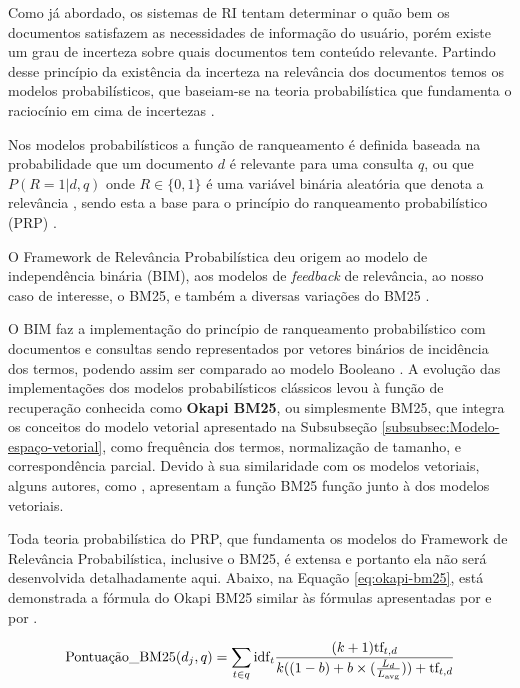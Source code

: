     Como já abordado, os sistemas de RI tentam determinar o quão bem os documentos satisfazem as necessidades de informação do usuário, porém existe um grau de incerteza sobre quais documentos tem conteúdo relevante. 
    Partindo desse princípio da existência da incerteza na relevância dos documentos temos os modelos probabilísticos, que baseiam-se na teoria probabilística que fundamenta o raciocínio em cima de incertezas \cite[p.~201]{Manning2008IIR}. 
    
    Nos modelos probabilísticos a função de ranqueamento é definida baseada na probabilidade que um documento $d$ é relevante para uma consulta $q$, ou que $P(R = 1| d,q)$ onde $R \in \{0, 1\}$ é uma variável binária aleatória que denota a relevância \cite[p.~111--112]{Zhai2016TDMA}, sendo esta a base para o princípio do ranqueamento probabilístico (PRP) \cite[p.~203]{Manning2008IIR}.
    
    O Framework de Relevância Probabilística deu origem ao modelo de independência binária (BIM), aos modelos de \textit{feedback} de relevância, ao nosso caso de interesse, o BM25, e também a diversas variações do BM25 \cite{robertson_probabilistic_2010}. 
    
    O BIM faz a implementação do princípio de ranqueamento probabilístico com documentos e consultas sendo representados por vetores binários de incidência dos termos, podendo assim ser comparado ao modelo Booleano \cite[p.~204]{Manning2008IIR}.
    A evolução das implementações dos modelos probabilísticos clássicos levou à função de recuperação conhecida como \textbf{Okapi BM25}, ou simplesmente BM25, que integra os conceitos do modelo vetorial apresentado na Subsubseção \ref{subsubsec:Modelo-espaço-vetorial}, como frequência dos termos, normalização de tamanho, e correspondência parcial.
    Devido à sua similaridade com os modelos vetoriais, alguns autores, como , apresentam a função BM25 função junto à dos modelos vetoriais.
    
    Toda teoria probabilística do PRP, que fundamenta os modelos do Framework de Relevância Probabilística, inclusive o BM25, é extensa e portanto ela não será  desenvolvida detalhadamente aqui.
    Abaixo, na Equação \ref{eq:okapi-bm25}, está demonstrada a fórmula do Okapi BM25 similar às fórmulas apresentadas por  e por .
    
    \begin{equation}
        \label{eq:okapi-bm25}
		\text{Pontuação\_BM25}(d_j, q) = \sum_{t \in q} \text{idf}_{\text{\textit{t}}} \frac{(k + 1) \text{tf}_{t,d}}{k((1-b)+b \times (\frac{L_d}{L_{\text{avg}}})) + \text{tf}_{t,d}} 
    \end{equation}

